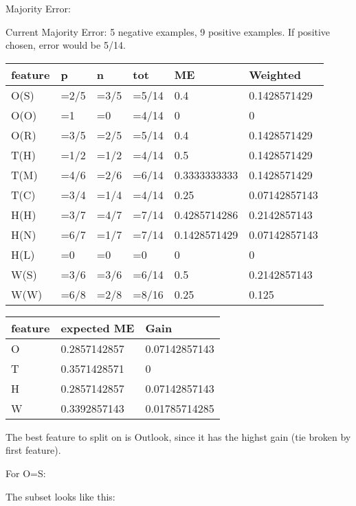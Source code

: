 \documentclass[12pt, fullpage,letterpaper]{article}
\begin{document}
\begin{enumerate}
\begin{enumerate}
Majority Error:

Current Majority Error:  5 negative examples, 9 positive examples. If positive chosen, error would be 5/14.

\begin{tabular}{|l|l|l|l|l|l|}
	\hline
	feature & p    & n    & tot   & ME           & Weighted      \\ \hline
	O(S)    & =2/5 & =3/5 & =5/14 & 0.4          & 0.1428571429  \\ \hline
	O(O)    & =1   & =0   & =4/14 & 0            & 0             \\ \hline
	O(R)    & =3/5 & =2/5 & =5/14 & 0.4          & 0.1428571429  \\ \hline
	T(H)    & =1/2 & =1/2 & =4/14 & 0.5          & 0.1428571429  \\ \hline
	T(M)    & =4/6 & =2/6 & =6/14 & 0.3333333333 & 0.1428571429  \\ \hline
	T(C)    & =3/4 & =1/4 & =4/14 & 0.25         & 0.07142857143 \\ \hline
	H(H)    & =3/7 & =4/7 & =7/14 & 0.4285714286 & 0.2142857143  \\ \hline
	H(N)    & =6/7 & =1/7 & =7/14 & 0.1428571429 & 0.07142857143 \\ \hline
	H(L)    & =0   & =0   & =0    & 0            & 0             \\ \hline
	W(S)    & =3/6 & =3/6 & =6/14 & 0.5          & 0.2142857143  \\ \hline
	W(W)    & =6/8 & =2/8 & =8/16 & 0.25         & 0.125         \\ \hline
	\end{tabular}

	\begin{tabular}{|l|l|l|}
		\hline
		feature & expected ME  & Gain          \\ \hline
		O       & 0.2857142857 & 0.07142857143 \\ \hline
		T       & 0.3571428571 & 0             \\ \hline
		H       & 0.2857142857 & 0.07142857143 \\ \hline
		W       & 0.3392857143 & 0.01785714285 \\ \hline
		\end{tabular}


		The best feature to split on is Outlook, since it has the highst gain (tie broken by first feature). 

		For O=S:
		
		The subset looks like this:
		

\end{enumerate}
\end{enumerate}
\end{document}
